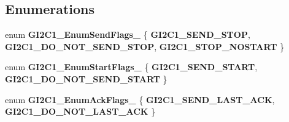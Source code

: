 \subsection*{Enumerations}
\begin{DoxyCompactItemize}
\item 
enum {\bfseries G\-I2\-C1\-\_\-\-Enum\-Send\-Flags\-\_\-} \{ {\bfseries G\-I2\-C1\-\_\-\-S\-E\-N\-D\-\_\-\-S\-T\-O\-P}, 
{\bfseries G\-I2\-C1\-\_\-\-D\-O\-\_\-\-N\-O\-T\-\_\-\-S\-E\-N\-D\-\_\-\-S\-T\-O\-P}, 
{\bfseries G\-I2\-C1\-\_\-\-S\-T\-O\-P\-\_\-\-N\-O\-S\-T\-A\-R\-T}
 \}
\item 
enum {\bfseries G\-I2\-C1\-\_\-\-Enum\-Start\-Flags\-\_\-} \{ {\bfseries G\-I2\-C1\-\_\-\-S\-E\-N\-D\-\_\-\-S\-T\-A\-R\-T}, 
{\bfseries G\-I2\-C1\-\_\-\-D\-O\-\_\-\-N\-O\-T\-\_\-\-S\-E\-N\-D\-\_\-\-S\-T\-A\-R\-T}
 \}
\item 
enum {\bfseries G\-I2\-C1\-\_\-\-Enum\-Ack\-Flags\-\_\-} \{ {\bfseries G\-I2\-C1\-\_\-\-S\-E\-N\-D\-\_\-\-L\-A\-S\-T\-\_\-\-A\-C\-K}, 
{\bfseries G\-I2\-C1\-\_\-\-D\-O\-\_\-\-N\-O\-T\-\_\-\-L\-A\-S\-T\-\_\-\-A\-C\-K}
 \}
\end{DoxyCompactItemize}
